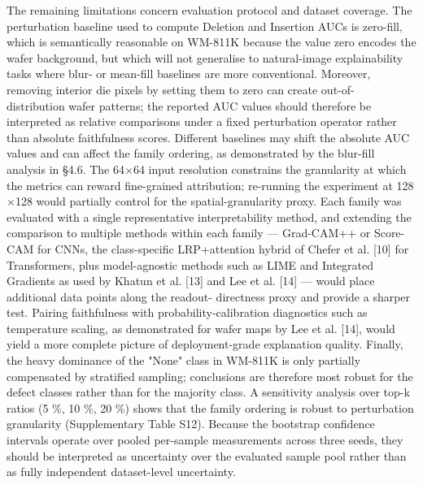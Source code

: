 \documentclass[11pt,a4paper]{article}
\begin{document}
The remaining limitations concern evaluation protocol and dataset coverage. The perturbation baseline used to compute Deletion and Insertion AUCs is zero-fill, which is semantically reasonable on WM-811K because the value zero encodes the wafer background, but which will not generalise to natural-image explainability tasks where blur- or mean-fill baselines are more conventional. Moreover, removing interior die pixels by setting them to zero can create out-of- distribution wafer patterns; the reported AUC values should therefore be interpreted as relative comparisons under a fixed perturbation operator rather than absolute faithfulness scores. Different baselines may shift the absolute AUC values and can affect the family ordering, as demonstrated by the blur-fill analysis in \S{}4.6. The 64$\times$64 input resolution constrains the granularity at which the metrics can reward
fine-grained attribution; re-running the experiment at 128$\times$128 would partially control for the spatial-granularity proxy. Each family was evaluated with a single representative interpretability method, and extending the comparison to multiple methods within each family --- Grad-CAM++ or Score-CAM for CNNs, the class-specific LRP+attention hybrid of Chefer et al. [10] for Transformers, plus model-agnostic methods such as LIME and Integrated Gradients as used by Khatun et al. [13] and Lee et al. [14] --- would place additional data points along the readout- directness proxy and provide a sharper test. Pairing faithfulness with probability-calibration diagnostics such as temperature scaling, as demonstrated for wafer maps by Lee et al. [14], would yield a more complete picture of deployment-grade explanation quality. Finally, the heavy dominance of the "None" class in WM-811K is only
partially compensated by stratified sampling; conclusions are therefore most robust for the defect classes rather than for the majority class. A sensitivity analysis over top-k ratios (5 \%, 10 \%, 20 \%) shows that the family ordering is robust to perturbation granularity (Supplementary Table S12). Because the bootstrap confidence intervals operate over pooled per-sample measurements across three seeds, they should be interpreted as uncertainty over the evaluated sample pool rather than as fully independent dataset-level uncertainty.
\end{document}
